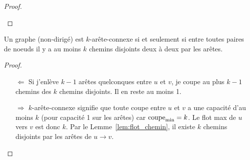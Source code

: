 \begin{mylem}
\begin{proof}
    \begin{figure}[h!]
      \centering
    \end{figure}
  \end{proof}
\end{mylem}

\begin{mytheo}
  \label{theo:kconnexe_chemin}
  Un graphe (non-dirigé) est $k$-arête-connexe si et seulement si entre toutes paires de noeuds il y a au moins $k$ chemins disjoints deux à deux par les arêtes.
  \begin{proof}
    \begin{itemize}
      \item[$\Leftarrow$]
        Si j'enlève $k-1$ arêtes quelconques
        entre $u$ et $v$, je coupe au plus $k-1$
        chemins des $k$ chemins disjoints.
        Il en reste au moins 1.
      \item[$\Rightarrow$]
        $k$-arête-connexe signifie que toute coupe entre $u$
        et $v$ a une capacité d'au moins $k$ (pour capacité 1
        sur les arêtes) car $\operatorname{\mathrm{coupe}_\mathrm{min}} = k$.
        Le flot max de $u$ vers $v$ est donc $k$.
        Par le Lemme~\ref{lem:flot_chemin},
        il existe $k$ chemins disjoints par les arêtes de
        $u \to v$.
    \end{itemize}
  \end{proof}
\end{mytheo}

